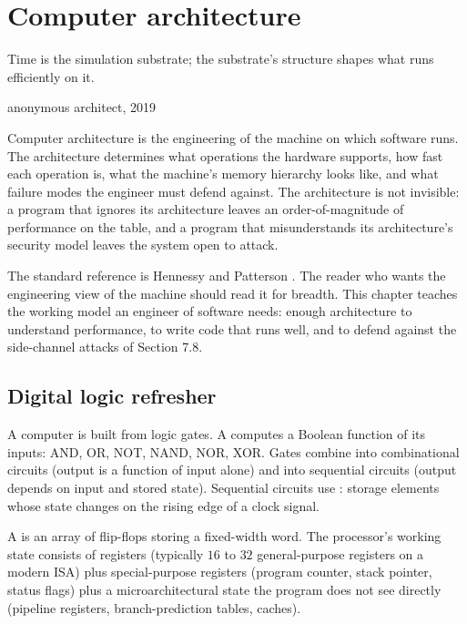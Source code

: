 \chapter{Computer architecture}
\label{vol07:ch07}

\epigraph{Time is the simulation substrate; the substrate's structure shapes what runs efficiently on it.}{anonymous architect, 2019}


\noindent
Computer architecture is the engineering of the machine on which software runs. The architecture determines what operations the hardware supports, how fast each operation is, what the machine's memory hierarchy looks like, and what failure modes the engineer must defend against. The architecture is not invisible: a program that ignores its architecture leaves an order-of-magnitude of performance on the table, and a program that misunderstands its architecture's security model leaves the system open to attack.

The standard reference is Hennessy and Patterson \cite{text:hennessy-patterson2019}. The reader who wants the engineering view of the machine should read it for breadth. This chapter teaches the working model an engineer of software needs: enough architecture to understand performance, to write code that runs well, and to defend against the side-channel attacks of Section 7.8.

\section{Digital logic refresher}

A computer is built from logic gates. A  computes a Boolean function of its inputs: AND, OR, NOT, NAND, NOR, XOR. Gates combine into combinational circuits (output is a function of input alone) and into sequential circuits (output depends on input and stored state). Sequential circuits use : storage elements whose state changes on the rising edge of a clock signal.

A  is an array of flip-flops storing a fixed-width word. The processor's working state consists of registers (typically $16$ to $32$ general-purpose registers on a modern ISA) plus special-purpose registers (program counter, stack pointer, status flags) plus a microarchitectural state the program does not see directly (pipeline registers, branch-prediction tables, caches).

